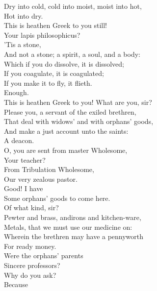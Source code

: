 \documentclass[a4paper,oneside]{memoir}
\begin{document}
\begin{drama*}
Dry into cold, cold into moist, moist into hot,\\
Hot into dry.\\
\subtlespeaks {} This is heathen Greek to you still!\\
Your lapis philosophicus?\\
\facespeaks {} 'Tis a stone,\\
And not a stone; a spirit, a soul, and a body:\\
Which if you do dissolve, it is dissolved;\\
If you coagulate, it is coagulated;\\
If you make it to fly, it flieth.\\
\subtlespeaks {} Enough.\\
This is heathen Greek to you! What are you, sir?\\
\ananiasspeaks Please you, a servant of the exiled brethren,\\
That deal with widows' and with orphans' goods,\\
And make a just account unto the saints:\\
A deacon.\\
\subtlespeaks {} O, you are sent from master Wholesome,\\
Your teacher?\\
\ananiasspeaks {} From Tribulation Wholesome,\\
Our very zealous pastor.\\
\subtlespeaks {} Good! I have\\
Some orphans' goods to come here.\\
\ananiasspeaks {} Of what kind, sir?\\
\subtlespeaks Pewter and brass, andirons and kitchen-ware,\\
Metals, that we must use our medicine on:\\
Wherein the brethren may have a pennyworth\\
For ready money.\\
\ananiasspeaks {} Were the orphans' parents\\
Sincere professors?\\
\subtlespeaks {} Why do you ask?\\
\ananiasspeaks {} Because\\

\end{drama*}
\end{document}
